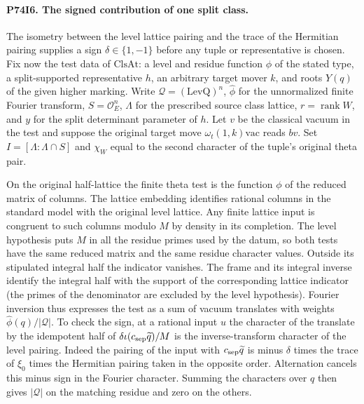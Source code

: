 \paragraph{P74I6. The signed contribution of one split class.}
The isometry between the level lattice pairing and the trace of the
Hermitian pairing supplies a sign $\delta\in\{1,-1\}$ before any
tuple or representative is chosen. Fix now the test data of
$\mathrm{ClsAt}$: a level and residue function $\phi$ of the stated
type, a split-supported representative $h$, an arbitrary target
mover $k$, and roots $Y(q)$ of the given higher marking.
Write $\mathcal Q=(\mathrm{LevQ})^n$, $\widehat\phi$ for the
unnormalized finite Fourier transform, $S=\mathcal O_E^n$,
$\Lambda$ for the prescribed source class lattice, $r=\operatorname{rank}W$,
and $y$ for the split determinant parameter of $h$. Let $v$ be
the classical vacuum in the test and suppose the original target
move $\omega_t(1,k)\mathrm{vac}$ reads $b v$.
Set $I=[\Lambda:\Lambda\cap S]$ and $\chi_W$ equal to the second
character of the tuple's original theta pair.

On the original half-lattice the finite theta test is the function
$\phi$ of the reduced matrix of columns. The lattice embedding
identifies rational columns in the standard model with the original
level lattice. Any finite lattice input is congruent to such columns
modulo $M$ by density in its completion. The level hypothesis puts
$M$ in all the residue primes used by the datum, so both tests have
the same reduced matrix and the same residue character values.
Outside its stipulated integral half the indicator vanishes. The
frame and its integral inverse identify the integral half with the
support of the corresponding lattice indicator (the primes of the
denominator are excluded by the level hypothesis). Fourier inversion
thus expresses the test as a sum of vacuum translates with weights
$\widehat\phi(q)/|\mathcal Q|$. To check the sign, at a rational
input $u$ the character of the translate by the idempotent half of
$\delta\iota(c_{\rm sep}\widetilde q)/M$ is the inverse-transform
character of the level pairing. Indeed the pairing of the input
with $c_{\rm sep}\widetilde q$ is minus $\delta$ times the trace
of $\xi_0$ times the Hermitian pairing taken in the opposite order.
Alternation cancels this minus sign in the Fourier character.
Summing the characters over $q$ then gives $|\mathcal Q|$ on the
matching residue and zero on the others.

